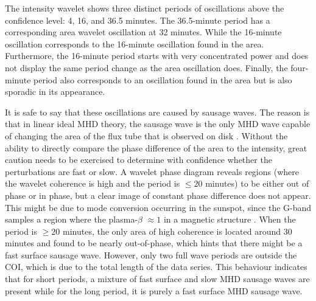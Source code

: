 	The intensity wavelet shows three distinct periods of oscillations above the confidence level: 4, 16, and 36.5 minutes.
	The 36.5-minute period has a corresponding area wavelet oscillation at 32 minutes.
	While the 16-minute oscillation corresponds to the 16-minute oscillation found in the area.
	Furthermore, the 16-minute period starts with very concentrated power and does not display the same period change as the area oscillation does.
	Finally, the four-minute period also corresponds to an oscillation found in the area but is also sporadic in its appearance.
	
	It is safe to say that these oscillations are caused by sausage waves.
	The reason is that in linear ideal MHD theory, the sausage wave is the only MHD wave capable of changing the area of the flux tube that is observed on disk \citep[see e.g.][]{2003A&A...397..765C,CLOO}.
	Without the ability to directly compare the phase difference of the area to the intensity, great caution needs to be exercised to determine with confidence whether the perturbations are fast or slow.
	A wavelet phase diagram reveals regions (where the wavelet coherence is high and the period is $\le 20$ minutes) to be either out of phase or in phase, but a clear image of constant phase difference does not appear.
	This might be due to mode conversion occurring in the sunspot, since the G-band samples a region where the plasma-$\beta$ $\approx 1$ in a magnetic structure \citep{gary}.
	When the period is $\ge 20$ minutes, the only area of high coherence is located around 30 minutes and found to be nearly out-of-phase, which hints that there might be a fast surface sausage wave.
	However, only two full wave periods are outside the COI, which is due to the total length of the data series.
	This behaviour indicates that for short periods, a mixture of fast surface and slow MHD sausage waves are present while for the long period, it is purely a fast surface MHD sausage wave.
		
